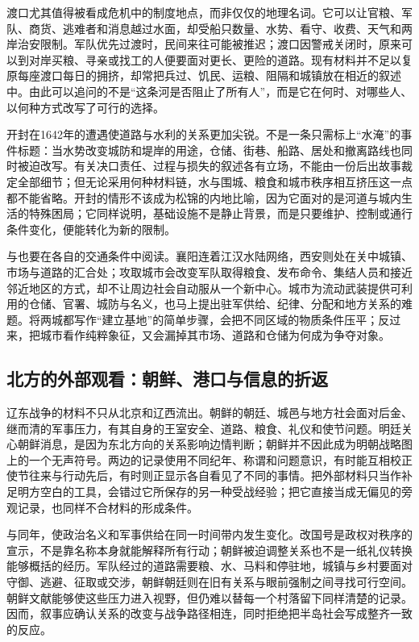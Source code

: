 渡口尤其值得被看成危机中的制度地点，而非仅仅的地理名词。它可以让官粮、军队、商货、逃难者和消息越过水面，却受船只数量、水势、看守、收费、天气和两岸治安限制。军队优先过渡时，民间来往可能被推迟；渡口因警戒关闭时，原来可以到对岸买粮、寻亲或找工的人便要面对更长、更险的道路。现有材料并不足以复原每座渡口每日的拥挤，却常把兵过、饥民、运粮、阻隔和城镇放在相近的叙述中。由此可以追问的不是“这条河是否阻止了所有人”，而是它在何时、对哪些人、以何种方式改写了可行的选择。

开封在1642年的遭遇使道路与水利的关系更加尖锐。不是一条只需标上“水淹”的事件标题：当水势改变城防和堤岸的用途，仓储、街巷、船路、居处和撤离路线也同时被迫改写。有关决口责任、过程与损失的叙述各有立场，不能由一份后出故事裁定全部细节；但无论采用何种材料链，水与围城、粮食和城市秩序相互挤压这一点都不能省略。开封的情形不该成为松锦的内地比喻，因为它面对的是河道与城内生活的特殊困局；它同样说明，基础设施不是静止背景，而是只要维护、控制或通行条件变化，便能转化为新的限制。

与也要在各自的交通条件中阅读。襄阳连着江汉水陆网络，西安则处在关中城镇、市场与道路的汇合处；攻取城市会改变军队取得粮食、发布命令、集结人员和接近邻近地区的方式，却不让周边社会自动服从一个新中心。城市为流动武装提供可利用的仓储、官署、城防与名义，也马上提出驻军供给、纪律、分配和地方关系的难题。将两城都写作“建立基地”的简单步骤，会把不同区域的物质条件压平；反过来，把城市看作纯粹象征，又会漏掉其市场、道路和仓储为何成为争夺对象。

\subsection{北方的外部观看：朝鲜、港口与信息的折返}

辽东战争的材料不只从北京和辽西流出。朝鲜的朝廷、城邑与地方社会面对后金、继而清的军事压力，有其自身的王室安全、道路、粮食、礼仪和使节问题。明廷关心朝鲜消息，是因为东北方向的关系影响边情判断；朝鲜并不因此成为明朝战略图上的一个无声符号。两边的记录使用不同纪年、称谓和问题意识，有时能互相校正使节往来与行动先后，有时则正显示各自看见了不同的事情。把外部材料只当作补足明方空白的工具，会错过它所保存的另一种受战经验；把它直接当成无偏见的旁观记录，也同样不合材料的形成条件。

与同年，使政治名义和军事供给在同一时间带内发生变化。改国号是政权对秩序的宣示，不是靠名称本身就能解释所有行动；朝鲜被迫调整关系也不是一纸礼仪转换能够概括的经历。军队经过的道路需要粮、水、马料和停驻地，城镇与乡村要面对守御、逃避、征取或交涉，朝鲜朝廷则在旧有关系与眼前强制之间寻找可行空间。朝鲜文献能够使这些压力进入视野，但仍难以替每一个村落留下同样清楚的记录。因而，叙事应确认关系的改变与战争路径相连，同时拒绝把半岛社会写成整齐一致的反应。

